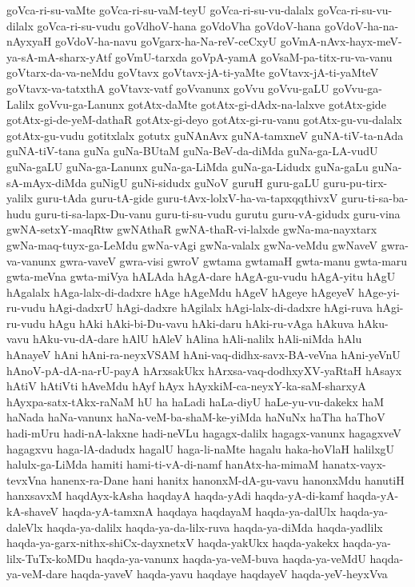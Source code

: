 {goVca-ri-su-vaMte
goVca-ri-su-vaM-teyU
goVca-ri-su-vu-dalalx
goVca-ri-su-vu-dilalx
goVca-ri-su-vudu
goVdhoV-hana
goVdoVha
goVdoV-hana
goVdoV-ha-na-nAyxyaH
goVdoV-ha-navu
goVgarx-ha-Na-reV-ceCxyU
goVmA-nAvx-hayx-meV-ya-sA-mA-sharx-yAtf
goVmU-tarxda
goVpA-yamA
goVsaM-pa-titx-ru-va-vanu
goVtarx-da-va-neMdu
goVtavx
goVtavx-jA-ti-yaMte
goVtavx-jA-ti-yaMteV
goVtavx-va-tatxthA
goVtavx-vatf
goVvanunx
goVvu
goVvu-gaLU
goVvu-ga-Lalilx
goVvu-ga-Lanunx
gotAtx-daMte
gotAtx-gi-dAdx-na-lalxve
gotAtx-gide
gotAtx-gi-de-yeM-dathaR
gotAtx-gi-deyo
gotAtx-gi-ru-vanu
gotAtx-gu-vu-dalalx
gotAtx-gu-vudu
gotitxlalx
gotutx
guNAnAvx
guNA-tamxneV
guNA-tiV-ta-nAda
guNA-tiV-tana
guNa
guNa-BUtaM
guNa-BeV-da-diMda
guNa-ga-LA-vudU
guNa-gaLU
guNa-ga-Lanunx
guNa-ga-LiMda
guNa-ga-Lidudx
guNa-gaLu
guNa-sA-mAyx-diMda
guNigU
guNi-sidudx
guNoV
guruH
guru-gaLU
guru-pu-tirx-yalilx
guru-tAda
guru-tA-gide
guru-tAvx-lolxV-ha-va-tapxqqthivxV
guru-ti-sa-ba-hudu
guru-ti-sa-lapx-Du-vanu
guru-ti-su-vudu
gurutu
guru-vA-gidudx
guru-vina
gwNA-setxY-maqRtw
gwNAthaR
gwNA-thaR-vi-lalxde
gwNa-ma-nayxtarx
gwNa-maq-tuyx-ga-LeMdu
gwNa-vAgi
gwNa-valalx
gwNa-veMdu
gwNaveV
gwra-va-vanunx
gwra-vaveV
gwra-visi
gwroV
gwtama
gwtamaH
gwta-manu
gwta-maru
gwta-meVna
gwta-miVya
hALAda
hAgA-dare
hAgA-gu-vudu
hAgA-yitu
hAgU
hAgalalx
hAga-lalx-di-dadxre
hAge
hAgeMdu
hAgeV
hAgeye
hAgeyeV
hAge-yi-ru-vudu
hAgi-dadxrU
hAgi-dadxre
hAgilalx
hAgi-lalx-di-dadxre
hAgi-ruva
hAgi-ru-vudu
hAgu
hAki
hAki-bi-Du-vavu
hAki-daru
hAki-ru-vAga
hAkuva
hAku-vavu
hAku-vu-dA-dare
hAlU
hAleV
hAlina
hAli-nalilx
hAli-niMda
hAlu
hAnayeV
hAni
hAni-ra-neyxVSAM
hAni-vaq-didhx-savx-BA-veVna
hAni-yeVnU
hAnoV-pA-dA-na-rU-payA
hArxsakUkx
hArxsa-vaq-dodhxyXV-yaRtaH
hAsayx
hAtiV
hAtiVti
hAveMdu
hAyf
hAyx
hAyxkiM-ca-neyxY-ka-saM-sharxyA
hAyxpa-satx-tAkx-raNaM
hU
ha
haLadi
haLa-diyU
haLe-yu-vu-dakekx
haM
haNada
haNa-vanunx
haNa-veM-ba-shaM-ke-yiMda
haNuNx
haTha
haThoV
hadi-mUru
hadi-nA-lakxne
hadi-neVLu
hagagx-dalilx
hagagx-vanunx
hagagxveV
hagagxvu
haga-lA-dadudx
hagalU
haga-li-naMte
hagalu
haka-hoVlaH
halilxgU
halulx-ga-LiMda
hamiti
hami-ti-vA-di-namf
hanAtx-ha-mimaM
hanatx-vayx-tevxVna
hanenx-ra-Dane
hani
hanitx
hanonxM-dA-gu-vavu
hanonxMdu
hanutiH
hanxsavxM
haqdAyx-kAsha
haqdayA
haqda-yAdi
haqda-yA-di-kamf
haqda-yA-kA-shaveV
haqda-yA-tamxnA
haqdaya
haqdayaM
haqda-ya-dalUlx
haqda-ya-daleVlx
haqda-ya-dalilx
haqda-ya-da-lilx-ruva
haqda-ya-diMda
haqda-yadlilx
haqda-ya-garx-nithx-shiCx-dayxnetxV
haqda-yakUkx
haqda-yakekx
haqda-ya-lilx-TuTx-koMDu
haqda-ya-vanunx
haqda-ya-veM-buva
haqda-ya-veMdU
haqda-ya-veM-dare
haqda-yaveV
haqda-yavu
haqdaye
haqdayeV
haqda-yeV-heyxVva
}
